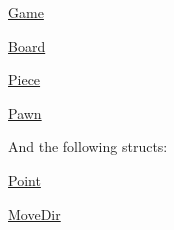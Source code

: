 \begin{DoxyItemize}
\item \hyperlink{class_game}{Game}  
\item \hyperlink{class_board}{Board}  
\item \hyperlink{class_piece}{Piece}  
\item \hyperlink{class_pawn}{Pawn}  
\end{DoxyItemize}

And the following structs\-:


\begin{DoxyItemize}
\item \hyperlink{struct_point}{Point} 
\item \hyperlink{struct_move_dir}{Move\-Dir} 
\end{DoxyItemize}